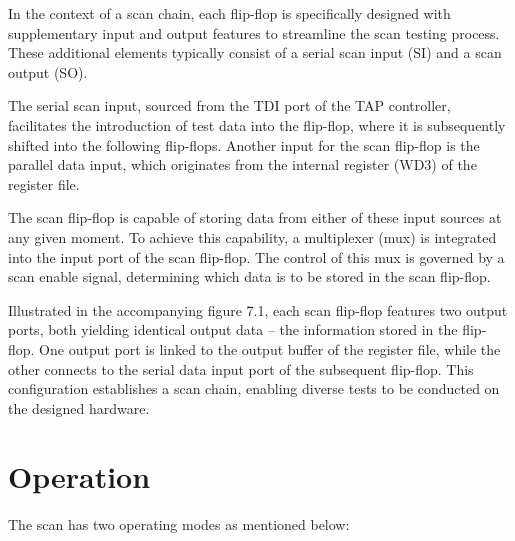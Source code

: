 In the context of a scan chain, each flip-flop is specifically designed with supplementary input and output features to streamline the scan testing process. These additional elements typically consist of a serial scan input (SI) and a scan output (SO).


\vspace{2mm}
The serial scan input, sourced from the TDI port of the TAP controller, facilitates the introduction of test data into the flip-flop, where it is subsequently shifted into the following flip-flops. Another input for the scan flip-flop is the parallel data input, which originates from the internal register (WD3) of the register file.


\vspace{2mm}
The scan flip-flop is capable of storing data from either of these input sources at any given moment. To achieve this capability, a multiplexer (mux) is integrated into the input port of the scan flip-flop. The control of this mux is governed by a scan enable signal, determining which data is to be stored in the scan flip-flop.


\vspace{2mm}
Illustrated in the accompanying figure 7.1, each scan flip-flop features two output ports, both yielding identical output data – the information stored in the flip-flop. One output port is linked to the output buffer of the register file, while the other connects to the serial data input port of the subsequent flip-flop. This configuration establishes a scan chain, enabling diverse tests to be conducted on the designed hardware.


\vspace{2mm}

\section{Operation}

The scan has two operating modes as mentioned below:

